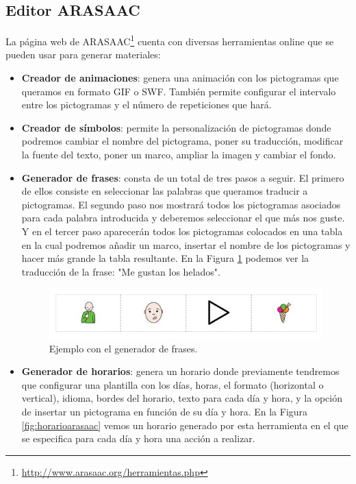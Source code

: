 \subsection{Editor ARASAAC}
La página web de ARASAAC\footnote{\url{http://www.arasaac.org/herramientas.php}} cuenta con diversas herramientas online que se pueden usar para generar materiales:
\begin{itemize}
\item \textbf{Creador de animaciones}: genera una animación con los pictogramas que queramos en formato GIF o SWF. También permite configurar el intervalo entre los pictogramas y el número de repeticiones que hará.

\item \textbf{Creador de símbolos}: permite la personalización de pictogramas donde podremos cambiar el nombre del pictograma, poner su traducción, modificar la fuente del texto, poner un marco, ampliar la imagen y cambiar el fondo.

\item \textbf{Generador de frases}: consta de un total de tres pasos a seguir. El primero de ellos consiste en seleccionar las palabras que queramos traducir a pictogramas. El segundo paso nos mostrará todos los pictogramas asociados para cada palabra introducida y deberemos seleccionar el que más nos guste. Y en el tercer paso aparecerán todos los pictogramas colocados en una tabla en la cual podremos añadir un marco, insertar el nombre de los pictogramas y hacer más grande la tabla resultante. En la Figura \ref{fig:frase-arasaac} podemos ver la traducción de la frase: "Me gustan los helados".


\begin{figure}[h!]
	\centering
	\includegraphics[width=0.7\linewidth]{Imagenes/Bitmap/Frase ARASAAC}
	\caption{Ejemplo con el generador de frases.}
	\label{fig:frase-arasaac}
\end{figure}


\item \textbf{Generador de horarios}: genera un horario donde previamente tendremos que configurar una plantilla con los días, horas, el formato (horizontal o vertical), idioma, bordes del horario, texto para cada día y hora, y la opción de insertar un pictograma en función de su día y hora. En la Figura \ref{fig:horarioarasaac} vemos un horario generado por esta herramienta en el que se especifica para cada día y hora una acción a realizar.


\end{itemize}

